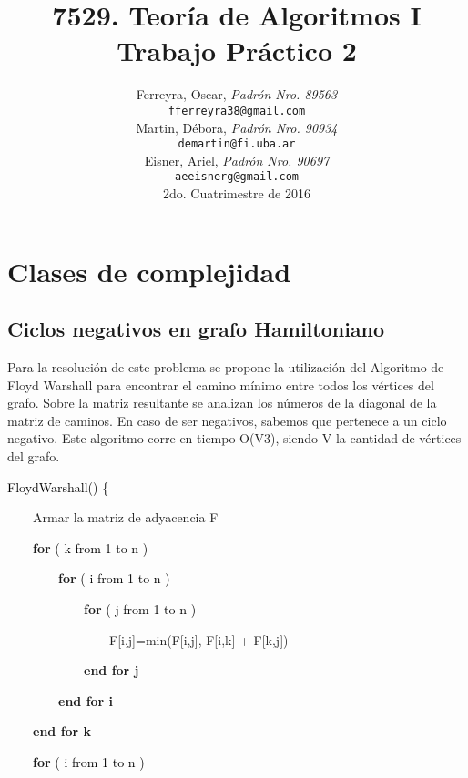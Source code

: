 \documentclass[a4paper,10pt]{article}
\title{ \textbf{ 7529. Teoría de Algoritmos I\\
Trabajo Práctico 2}}
\author{ Ferreyra, Oscar, \textit{Padrón Nro. 89563} \\
\texttt{ fferreyra38@gmail.com } \\[2.5ex]
Martin, Débora, \textit{Padrón Nro. 90934} \\
\texttt{ demartin@fi.uba.ar } \\[2.5ex]
Eisner, Ariel, \textit{Padrón Nro. 90697} \\
\texttt{ aeeisnerg@gmail.com } \\[2.5ex]
\normalsize{2do. Cuatrimestre de 2016} \\
}
\date{}
\begin{document}
\maketitle
\thispagestyle{empty} %
\setcounter{page}{0}
\newpage
\tableofcontents

\newpage

\section{Clases de complejidad}


\subsection{Ciclos negativos en grafo Hamiltoniano}
Para la resolución de este problema se propone la utilización del Algoritmo de Floyd Warshall para encontrar el camino mínimo entre todos los vértices del grafo. Sobre la matriz resultante se analizan los números de la diagonal de la matriz de caminos. En caso de ser negativos, sabemos que pertenece a un ciclo negativo. Este algoritmo corre en tiempo O(V3), siendo V la cantidad de vértices del grafo.

\bigskip

\textcolor[rgb]{0.4,0.4,0.4}{}\textcolor{black}{FloydWarshall() \{ }

\textcolor{black}{\ \ \ \ }Armar la matriz de adyacencia F

\textcolor{black}{\ \ \ \ }\textbf{\textcolor[rgb]{0.0,0.5019608,0.0}{for}}\textcolor{black}{ ( k from 1 to n )}

\textcolor{black}{\ \ \ \ \ \ \ \ }\textbf{\textcolor[rgb]{0.0,0.5019608,0.0}{for}}\textcolor{black}{ ( i from 1 to n )}

\textcolor{black}{\ \ \ \ \ \ \ \ \ \ \ \ }\textbf{\textcolor[rgb]{0.0,0.5019608,0.0}{for}}\textcolor{black}{ ( j from 1 to n )}

\textcolor{black}{\ \ \ \ \ \ \ \ \ \ \ \ \ \ \ \ }F[i,j]=min(F[i,j], F[i,k] + F[k,j])

\textcolor{black}{\ \ \ \ \ \ \ \ \ \ \ \ }\textbf{\textcolor[rgb]{0.0,0.5019608,0.0}{end for j}}

\textcolor{black}{\ \ \ \ \ \ \ \ }\textbf{\textcolor[rgb]{0.0,0.5019608,0.0}{end for i}}

\textcolor{black}{\ \ \ \ }\textbf{\textcolor[rgb]{0.0,0.5019608,0.0}{end for k}}

\bigskip

\textcolor{black}{\ \ \ \ }\textbf{\textcolor[rgb]{0.0,0.5019608,0.0}{for}}\textcolor{black}{ ( i from 1 to n )}
\end{document}

